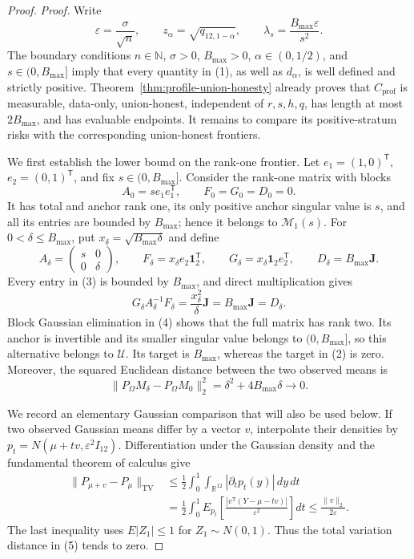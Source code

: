 \documentclass{article}
\begin{document}
\begin{proof}
\textit{Proof.}
Write
\[
 \varepsilon=\frac{\sigma}{\sqrt n},\qquad
 z_\alpha=\sqrt{q_{12,1-\alpha}},\qquad
 \lambda_s=\frac{B_{\max}\varepsilon}{s^2}.
\tag{1}
\]
The boundary conditions \(n\in\mathbb N\), \(\sigma>0\), \(B_{\max}>0\), \(\alpha\in(0,1/2)\), and \(s\in(0,B_{\max}]\) imply that every quantity in (1), as well as \(d_\alpha\), is well defined and strictly positive.  Theorem~\ref{thm:profile-union-honesty} already proves that \(C_{\mathrm{prof}}\) is measurable, data-only, union-honest, independent of \(r,s,h,q\), has length at most \(2B_{\max}\), and has evaluable endpoints.  It remains to compare its positive-stratum risks with the corresponding union-honest frontiers.

We first establish the lower bound on the rank-one frontier.  Let \(e_1=(1,0)^{\mathsf T}\), \(e_2=(0,1)^{\mathsf T}\), and fix \(s\in(0,B_{\max}]\).  Consider the rank-one matrix with blocks
\[
 A_0=se_1e_1^{\mathsf T},\qquad F_0=G_0=D_0=0.
\tag{2}
\]
It has total and anchor rank one, its only positive anchor singular value is \(s\), and all its entries are bounded by \(B_{\max}\); hence it belongs to \(\mathcal M_1(s)\).  For \(0<\delta\leq B_{\max}\), put \(x_\delta=\sqrt{B_{\max}\delta}\) and define
\[
 A_\delta=\begin{pmatrix}s&0\\0&\delta\end{pmatrix},\qquad
 F_\delta=x_\delta e_2\mathbf1_2^{\mathsf T},\qquad
 G_\delta=x_\delta\mathbf1_2e_2^{\mathsf T},\qquad
 D_\delta=B_{\max}\mathbf J.
\tag{3}
\]
Every entry in (3) is bounded by \(B_{\max}\), and direct multiplication gives
\[
 G_\delta A_\delta^{-1}F_\delta
 =\frac{x_\delta^2}{\delta}\mathbf J
 =B_{\max}\mathbf J=D_\delta.
\tag{4}
\]
Block Gaussian elimination in (4) shows that the full matrix has rank two.  Its anchor is invertible and its smaller singular value belongs to \((0,B_{\max}]\), so this alternative belongs to \(\mathcal U\).  Its target is \(B_{\max}\), whereas the target in (2) is zero.  Moreover, the squared Euclidean distance between the two observed means is
\[
 \lVert P_\Omega M_\delta-P_\Omega M_0\rVert_2^2
 =\delta^2+4B_{\max}\delta\longrightarrow0.
\tag{5}
\]

We record an elementary Gaussian comparison that will also be used below.  If two observed Gaussian means differ by a vector \(v\), interpolate their densities by \(p_t=N(\mu+tv,\varepsilon^2I_{12})\).  Differentiation under the Gaussian density and the fundamental theorem of calculus give
\[
 \begin{split}
 \lVert P_{\mu+v}-P_\mu\rVert_{\mathrm{TV}}
 &\leq\frac12\int_0^1\int_{\mathbb R^{12}}|\partial_tp_t(y)|\,dy\,dt\\
 &=\frac12\int_0^1E_{p_t}\left[
 \frac{|v^{\mathsf T}(Y-\mu-tv)|}{\varepsilon^2}\right]dt
 \leq\frac{\lVert v\rVert_2}{2\varepsilon}.
 \end{split}
\tag{6}
\]
The last inequality uses \(E|Z_1|\leq1\) for \(Z_1\sim N(0,1)\).  Thus the total variation distance in (5) tends to zero.


\end{proof}
\end{document}
